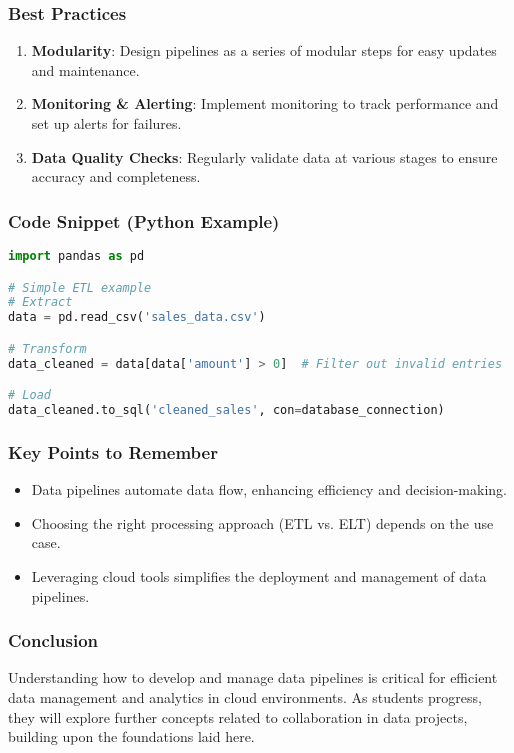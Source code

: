 \documentclass[aspectratio=169]{beamer}
\begin{document}
\begin{frame}[fragile]
    \frametitle{Best Practices}
    \begin{enumerate}
        \item \textbf{Modularity}: Design pipelines as a series of modular steps for easy updates and maintenance.
        \item \textbf{Monitoring \& Alerting}: Implement monitoring to track performance and set up alerts for failures.
        \item \textbf{Data Quality Checks}: Regularly validate data at various stages to ensure accuracy and completeness.
    \end{enumerate}
\end{frame}

\begin{frame}[fragile]
    \frametitle{Code Snippet (Python Example)}
    \begin{lstlisting}[language=Python]
import pandas as pd

# Simple ETL example
# Extract
data = pd.read_csv('sales_data.csv')

# Transform
data_cleaned = data[data['amount'] > 0]  # Filter out invalid entries

# Load
data_cleaned.to_sql('cleaned_sales', con=database_connection)
    \end{lstlisting}
\end{frame}

\begin{frame}[fragile]
    \frametitle{Key Points to Remember}
    \begin{itemize}
        \item Data pipelines automate data flow, enhancing efficiency and decision-making.
        \item Choosing the right processing approach (ETL vs. ELT) depends on the use case.
        \item Leveraging cloud tools simplifies the deployment and management of data pipelines.
    \end{itemize}
\end{frame}

\begin{frame}[fragile]
    \frametitle{Conclusion}
    Understanding how to develop and manage data pipelines is critical for efficient data management and analytics in cloud environments. 
    As students progress, they will explore further concepts related to collaboration in data projects, building upon the foundations laid here.
\end{frame}
\end{document}
